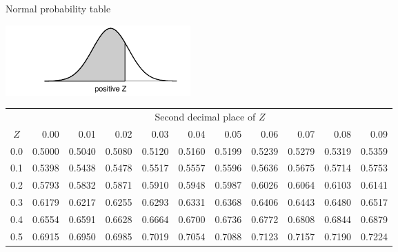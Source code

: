 \begin{table}[p]
\begin{center}
{\Large Normal probability table} \vspace{5mm}\\
{\small
\includegraphics[width=71mm]{figures/normalTails/normalTailRight} \vspace{2mm} \\
\begin{tabular}{c | rrrrr | rrrrr |}
  \cline{2-11}
&&&& \multicolumn{4}{c}{Second decimal place of $Z$} &&& \\
  \cline{2-11}
$Z$ & 0.00 & 0.01 & 0.02 & 0.03 & 0.04 & 0.05 & 0.06 & 0.07 & 0.08 & 0.09 \\
  \hline
  \hline
0.0 & \scriptsize{0.5000} & \scriptsize{0.5040} & \scriptsize{0.5080} & \scriptsize{0.5120} & \scriptsize{0.5160} & \scriptsize{0.5199} & \scriptsize{0.5239} & \scriptsize{0.5279} & \scriptsize{0.5319} & \scriptsize{0.5359} \\
  0.1 & \scriptsize{0.5398} & \scriptsize{0.5438} & \scriptsize{0.5478} & \scriptsize{0.5517} & \scriptsize{0.5557} & \scriptsize{0.5596} & \scriptsize{0.5636} & \scriptsize{0.5675} & \scriptsize{0.5714} & \scriptsize{0.5753} \\
  0.2 & \scriptsize{0.5793} & \scriptsize{0.5832} & \scriptsize{0.5871} & \scriptsize{0.5910} & \scriptsize{0.5948} & \scriptsize{0.5987} & \scriptsize{0.6026} & \scriptsize{0.6064} & \scriptsize{0.6103} & \scriptsize{0.6141} \\
  0.3 & \scriptsize{0.6179} & \scriptsize{0.6217} & \scriptsize{0.6255} & \scriptsize{0.6293} & \scriptsize{0.6331} & \scriptsize{0.6368} & \scriptsize{0.6406} & \scriptsize{0.6443} & \scriptsize{0.6480} & \scriptsize{0.6517} \\
  0.4 & \scriptsize{0.6554} & \scriptsize{0.6591} & \scriptsize{0.6628} & \scriptsize{0.6664} & \scriptsize{0.6700} & \scriptsize{0.6736} & \scriptsize{0.6772} & \scriptsize{0.6808} & \scriptsize{0.6844} & \scriptsize{0.6879} \\
  \hline
  0.5 & \scriptsize{0.6915} & \scriptsize{0.6950} & \scriptsize{0.6985} & \scriptsize{0.7019} & \scriptsize{0.7054} & \scriptsize{0.7088} & \scriptsize{0.7123} & \scriptsize{0.7157} & \scriptsize{0.7190} & \scriptsize{0.7224} \\

\end{tabular}}
\end{center}
\end{table}
